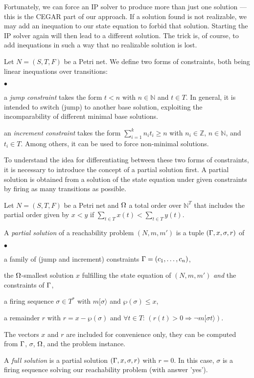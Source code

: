 \documentclass{LMCS}
\newcommand{\step}[1]{[#1\rangle}
\newcommand{\nat}{\mathbb{N}}
\newcommand{\Z}{\mathbb{Z}}
\newcommand{\then}{\Longrightarrow}
\newcommand{\parikh}{\wp}
\begin{document}
Fortunately, we can force an IP solver to produce more than just one solution --- this is the CEGAR part of our approach. 
If a solution found is not realizable, we may add an inequation to our state
equation to forbid that solution. Starting the IP solver again will then lead to a different solution. The trick is,
of course, to add inequations in such a way that no realizable solution is lost. 

\begin{defi}[Constraints]
Let $N=(S,T,F)$ be a Petri net.
We define two forms of constraints, both being linear inequations over transitions:
\begin{iteMize}{$\bullet$}
\item a {\em jump constraint} takes the form $t < n$ with $n\in\nat$ and $t\in T$. 
In general, it is intended to switch (jump)
to another base solution, exploiting the incomparability of different minimal base solutions.
\item an {\em increment constraint} takes the form $\sum_{i=1}^kn_it_i \ge n$ with $n_i\in\Z$, $n\in\nat$, and $t_i\in T$.
Among others, it can be used to force non-minimal solutions.
\end{iteMize}
\end{defi}

\noindent To understand the idea for differentiating between these two forms of constraints, it is necessary to introduce
the concept of a partial solution first. A partial solution is obtained from a solution of the state equation under
given constraints by firing as many transitions as possible.

\begin{defi}
Let $N=(S,T,F)$ be a Petri net and $\Omega$ a total order over $\nat^T$ that includes the partial order given by
$x<y$ if $\sum_{t\in T}x(t)<\sum_{t\in T}y(t)$. 

\noindent A {\em partial solution} of a reachability problem 
$(N,m,m')$ is a 
tuple 
$({\Gamma},x,\sigma,r)$ 
of
\begin{iteMize}{$\bullet$}
\item a family of (jump and increment) constraints ${\Gamma}=(c_1,\ldots,c_n)$,
\item the $\Omega$-smallest solution $x$ fulfilling the state equation of $(N,m,m')$ {\em and} the constraints of ${\Gamma}$,
\item a firing sequence $\sigma\in T^*$ with $m\step{\sigma}$ and $\parikh(\sigma)\le x$,
\item a remainder $r$ with $r = x-\parikh(\sigma)$ and $\forall t\in T$: $(r(t)>0\then\neg m\step{\sigma t})$.
\end{iteMize}
The vectors $x$ and $r$ are included for convenience only, they can be computed from ${\Gamma}$, $\sigma$, $\Omega$, and the problem instance.

A {\em full solution} is a partial solution $({\Gamma},x,\sigma,r)$ with $r=0$. In this case, $\sigma$ is a firing
sequence solving our reachability problem (with answer 'yes').
\end{defi}
\end{document}
